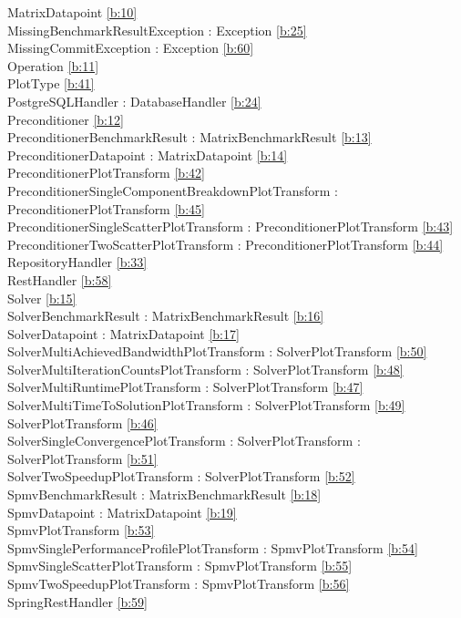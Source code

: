 MatrixDatapoint  \ref{b:10}\\
MissingBenchmarkResultException : Exception  \ref{b:25}\\
MissingCommitException : Exception  \ref{b:60}\\
Operation  \ref{b:11}\\
PlotType  \ref{b:41}\\
PostgreSQLHandler : DatabaseHandler  \ref{b:24}\\
Preconditioner  \ref{b:12}\\
PreconditionerBenchmarkResult : MatrixBenchmarkResult  \ref{b:13}\\
PreconditionerDatapoint : MatrixDatapoint  \ref{b:14}\\
PreconditionerPlotTransform  \ref{b:42}\\
PreconditionerSingleComponentBreakdownPlotTransform : PreconditionerPlotTransform  \ref{b:45}\\
PreconditionerSingleScatterPlotTransform : PreconditionerPlotTransform  \ref{b:43}\\
PreconditionerTwoScatterPlotTransform : PreconditionerPlotTransform  \ref{b:44}\\
RepositoryHandler  \ref{b:33}\\
RestHandler  \ref{b:58}\\
Solver  \ref{b:15}\\
SolverBenchmarkResult : MatrixBenchmarkResult  \ref{b:16}\\
SolverDatapoint : MatrixDatapoint  \ref{b:17}\\
SolverMultiAchievedBandwidthPlotTransform : SolverPlotTransform  \ref{b:50}\\
SolverMultiIterationCountsPlotTransform : SolverPlotTransform  \ref{b:48}\\
SolverMultiRuntimePlotTransform : SolverPlotTransform  \ref{b:47}\\
SolverMultiTimeToSolutionPlotTransform : SolverPlotTransform  \ref{b:49}\\
SolverPlotTransform  \ref{b:46}\\
SolverSingleConvergencePlotTransform : SolverPlotTransform : SolverPlotTransform  \ref{b:51}\\
SolverTwoSpeedupPlotTransform : SolverPlotTransform  \ref{b:52}\\
SpmvBenchmarkResult : MatrixBenchmarkResult  \ref{b:18}\\
SpmvDatapoint : MatrixDatapoint  \ref{b:19}\\
SpmvPlotTransform  \ref{b:53}\\
SpmvSinglePerformanceProfilePlotTransform : SpmvPlotTransform  \ref{b:54}\\
SpmvSingleScatterPlotTransform : SpmvPlotTransform  \ref{b:55}\\
SpmvTwoSpeedupPlotTransform : SpmvPlotTransform  \ref{b:56}\\
SpringRestHandler \ref{b:59}\\
